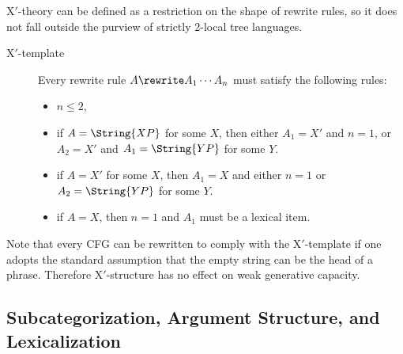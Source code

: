 X$'$-theory can be defined as a restriction on the shape of rewrite rules, so it does not fall outside the purview of strictly $2$-local tree languages.
%
\begin{description}
    \item[X$'$-template] Every rewrite rule $A \rewrite A_1 \cdots A_n$ must satisfy the following rules:
        \begin{itemize}
            \item $n \leq 2$,
            \item if $A = \String{XP}$ for some $X$, then either $A_1 = X'$ and $n = 1$, or $A_2 = X'$ and $A_1 = \String{YP}$ for some $Y$.
            \item if $A = X'$ for some $X$, then $A_1 = X$ and either $n = 1$ or $A_2 = \String{YP}$ for some $Y$.
            \item if $A = X$, then $n = 1$ and $A_1$ must be a lexical item.
        \end{itemize}
\end{description}
%
Note that every CFG can be rewritten to comply with the X$'$-template if one adopts the standard assumption that the empty string can be the head of a phrase.
Therefore X$'$-structure has no effect on weak generative capacity.

\subsection{Subcategorization, Argument Structure, and Lexicalization}

